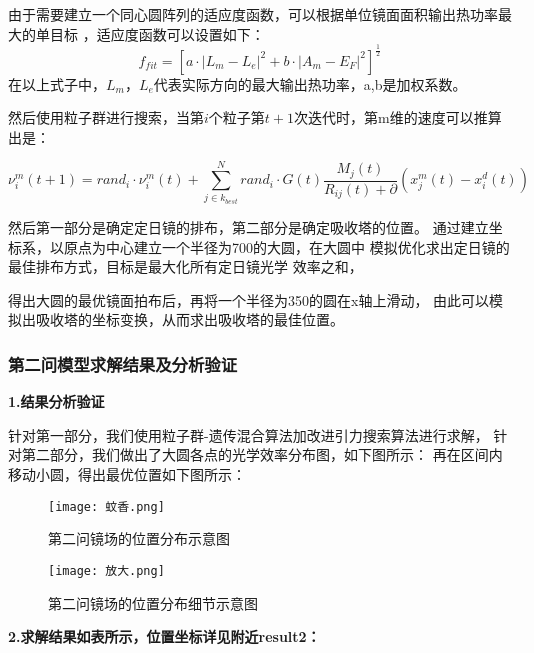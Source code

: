 \documentclass{数学建模}
\begin{document}
由于需要建立一个同心圆阵列的适应度函数，可以根据单位镜面面积输出热功率最大的单目标
，适应度函数可以设置如下：
\begin{equation}
    f_{fit} = [a \cdot |L_m - L_e|^2 + b\cdot |A_m - E_F|^2]^{\frac{1}{2}}
\end{equation}
在以上式子中，$L_m$，$L_e$代表实际方向的最大输出热功率，a,b是加权系数。

然后使用粒子群进行搜索，当第$i$个粒子第$t+1$次迭代时，第m维的速度可以推算出是：

\begin{equation}
    \nu_{i}^m(t+1) = rand_i \cdot \nu_{i}^m(t) + \sum_{j \in k_{best}}^{N} 
    rand_i \cdot G(t)\frac{M_{j}(t)}{R_{ij}(t)+\partial } (x_{j}^m(t) - x_{i}^d(t))  
\end{equation}

然后第一部分是确定定日镜的排布，第二部分是确定吸收塔的位置。
通过建立坐标系，以原点为中心建立一个半径为700的大圆，在大圆中
模拟优化求出定日镜的最佳排布方式，目标是最大化所有定日镜光学
效率之和，

得出大圆的最优镜面拍布后，再将一个半径为350的圆在x轴上滑动，
由此可以模拟出吸收塔的坐标变换，从而求出吸收塔的最佳位置。




\subsubsection{第二问模型求解结果及分析验证}



\textbf{1.结果分析验证}

针对第一部分，我们使用粒子群-遗传混合算法加改进引力搜索算法进行求解，
针对第二部分，我们做出了大圆各点的光学效率分布图，如下图所示：
再在区间内移动小圆，得出最优位置如下图所示：


\begin{figure}[H]  
    \centering\texttt{[image: 蚊香.png]}  
    \caption{第二问镜场的位置分布示意图}     
    \label{img01}  
\end{figure}

\begin{figure}[H]  
    \centering\texttt{[image: 放大.png]}  
    \caption{第二问镜场的位置分布细节示意图}     
    \label{img01}  
\end{figure}


\textbf{2.求解结果如表所示，位置坐标详见附近result2：}
\end{document}
